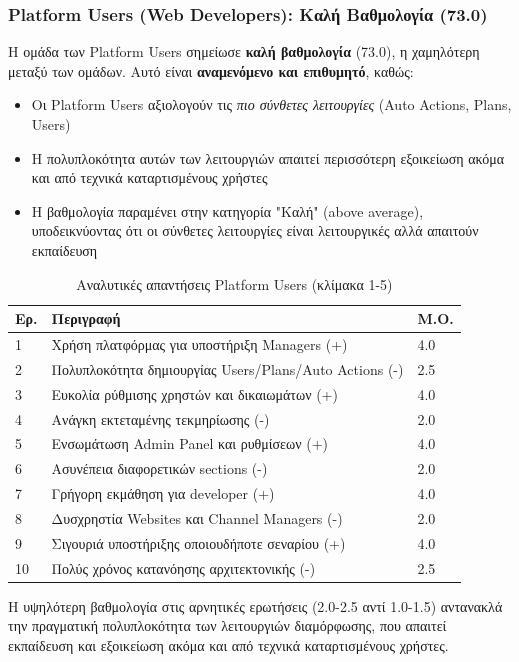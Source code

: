 \documentclass[
	12pt, %
	oneside, %
	greek,
	onehalfspacing, %
	liststotoc, %
	toctotoc, %
	parskip, %
	headsepline, %
]{MastersDoctoralThesis} %
\begin{document}
\subsubsection{Platform Users (Web Developers): Καλή Βαθμολογία (73.0)}

Η ομάδα των Platform Users σημείωσε \textbf{καλή βαθμολογία} (73.0), η χαμηλότερη μεταξύ των ομάδων. Αυτό είναι \textbf{αναμενόμενο και επιθυμητό}, καθώς:

\begin{itemize}
    \item Οι Platform Users αξιολογούν τις \textit{πιο σύνθετες λειτουργίες} (Auto Actions, Plans, Users)
    \item Η πολυπλοκότητα αυτών των λειτουργιών απαιτεί περισσότερη εξοικείωση ακόμα και από τεχνικά καταρτισμένους χρήστες
    \item Η βαθμολογία παραμένει στην κατηγορία "Καλή" (above average), υποδεικνύοντας ότι οι σύνθετες λειτουργίες είναι λειτουργικές αλλά απαιτούν εκπαίδευση
\end{itemize}

\begin{table}[H]
\centering
\caption{Αναλυτικές απαντήσεις Platform Users (κλίμακα 1-5)}
\label{tab:sus-devs-detail}
\begin{tabular}{@{}C{1cm}L{9cm}C{1.5cm}@{}}
\toprule
\textbf{Ερ.} & \textbf{Περιγραφή} & \textbf{Μ.Ο.} \\
 & Χρήση πλατφόρμας για υποστήριξη Managers (+) & 4.0 \\
2 & Πολυπλοκότητα δημιουργίας Users/Plans/Auto Actions (-) & 2.5 \\
3 & Ευκολία ρύθμισης χρηστών και δικαιωμάτων (+) & 4.0 \\
4 & Ανάγκη εκτεταμένης τεκμηρίωσης (-) & 2.0 \\
5 & Ενσωμάτωση Admin Panel και ρυθμίσεων (+) & 4.0 \\
6 & Ασυνέπεια διαφορετικών sections (-) & 2.0 \\
7 & Γρήγορη εκμάθηση για developer (+) & 4.0 \\
8 & Δυσχρηστία Websites και Channel Managers (-) & 2.0 \\
9 & Σιγουριά υποστήριξης οποιουδήποτε σεναρίου (+) & 4.0 \\
10 & Πολύς χρόνος κατανόησης αρχιτεκτονικής (-) & 2.5 \\
\bottomrule
\end{tabular}
\end{table}

Η υψηλότερη βαθμολογία στις αρνητικές ερωτήσεις (2.0-2.5 αντί 1.0-1.5) αντανακλά την πραγματική πολυπλοκότητα των λειτουργιών διαμόρφωσης, που απαιτεί εκπαίδευση και εξοικείωση ακόμα και από τεχνικά καταρτισμένους χρήστες.
\end{document}
